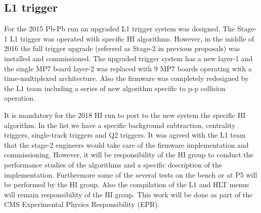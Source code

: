\subsection{L1 trigger\label{subsec:L1Trigger}}
For the 2015 Pb-Pb run an upgraded L1 trigger system was designed. The Stage-1 L1 trigger was operated with specific HI algorithms. However, in the middle of 2016 the full trigger upgrade (referred as Stage-2 in previous proposals) was installed and commissioned. The upgraded trigger system has a new layer-1 and the single MP7 board layer-2 was replaced with 9 MP7 boards operating with a time-multiplexed architecture. Also the firmware was completely redesigned by the L1 team including a series of new algorithm specific to p-p collision operation. 

It is mandatory for the 2018 HI run to port to the new system the specific HI algorithm. In the list we have a specific background subtraction, centrality triggers, single-track triggers and Q2 triggers. It was agreed with the L1 team that the stage-2 engineers would take care of the firmware implementation and commissioning. However, it will be responsibility of the HI group to conduct the performance studies of the algorithms and a specific description of the implementation. Furthermore some of the several tests on the bench or at P5 will be performed by the HI group. Also the compilation of the L1 and HLT menus will remain responsibility of the HI group. This work will be done as part of the CMS Experimental Physics Responsibility (EPR).
